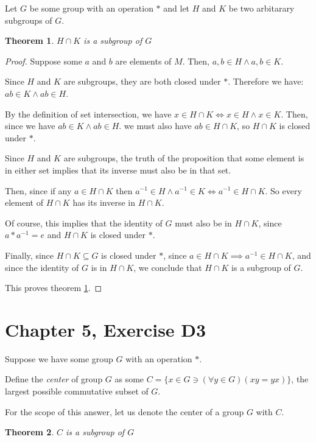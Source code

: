 \documentclass[12pt]{article}
\newtheorem{thm}{Theorem}
\begin{document}
Let $G$ be some group with an operation $*$ and let $H$ and $K$ be two arbitarary subgroups of $G$.

\begin{thm} \label{thm:10}
	$H \cap K$ is a subgroup of $G$
\end{thm}

\begin{proof}
	Suppose some
	$a$ and $b$ are elements of $M$.
	Then, $a,b \in H \land a,b \in K$.

	Since
	$H$ and $K$ are subgroups,
	they are both closed under $*$.
	Therefore we have:
	$ab \in K \land ab \in H$.

	By the definition of
	set intersection,
	we have $x \in H \cap K \iff x \in H \land x \in K$.
	Then, since we have
	$ab \in K \land ab \in H$.
	we must also have
	$ab \in H \cap K$,
	so $H \cap K$ is closed under $*$.

	Since
	$H$ and $K$ are subgroups,
	the truth of the proposition
	that some element is in either set
	implies that its inverse
	must also be in that set.

	Then,
	since if any $a \in H \cap K$
	then $a^{-1} \in H \land a^{-1} \in K \iff a^{-1} \in H \cap K$.
	So every element of $H \cap K$
	has its inverse in $H \cap K$.

	Of course,
	this implies that the identity of $G$
	must also be in $H \cap K$,
	since $a * a^{-1} = e$
	and $H \cap K$ is closed under $*$.

	Finally,
	since $H \cap K \subseteq G$ is closed under $*$,
	since $a \in H \cap K \implies a^{-1} \in H \cap K$,
	and since the identity of $G$ is in $H \cap K$,
	we conclude that $H \cap K$ is a subgroup of $G$.

	This proves theorem \ref{thm:10}.
\end{proof}

\section{Chapter 5, Exercise D3}

Suppose we have some group $G$ with an operation $*$.

Define the \textit{center} of group $G$ as
some $C = \{ x \in G \ni (\forall y \in G)(xy = yx) \}$,
the largest possible commutative subset of $G$.

For the scope of this answer, let us denote the center of a group $G$ with $C$.

\begin{thm} \label{thm:11}
	$C$ is a subgroup of $G$
\end{thm}
\end{document}
